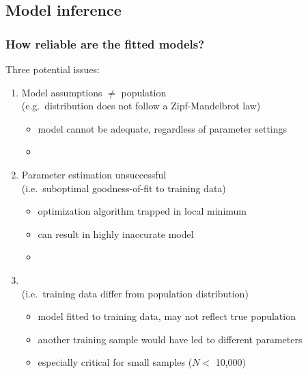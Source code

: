 \documentclass[t]{beamer} %
\begin{document}
\subsection{Model inference}

\begin{frame}
  \frametitle{How reliable are the fitted models?}
  
  Three potential issues:
  \begin{enumerate}
  \item<2-> Model assumptions $\neq$ population\\
    (e.g.\ distribution does not follow a Zipf-Mandelbrot law)
    \begin{itemize}
    \item[\hand] model cannot be adequate, regardless of parameter settings
    \item[]
    \end{itemize}
  \item<3-> Parameter estimation unsuccessful\\
    (i.e.\ suboptimal goodness-of-fit to training data)
    \begin{itemize}
    \item[\hand] optimization algorithm trapped in local minimum
    \item[\hand] can result in highly inaccurate model
    \item[]
    \end{itemize}
  \item<4-> \\
    (i.e.\ training data differ from population distribution)
    \begin{itemize}
    \item[\hand] model fitted to training data, may not reflect true population
    \item[\hand] another training sample would have led to different parameters
    \item[\hand] especially critical for small samples ($N < $ 10,000)
    \end{itemize}
  \end{enumerate}
\end{frame}
\end{document}
